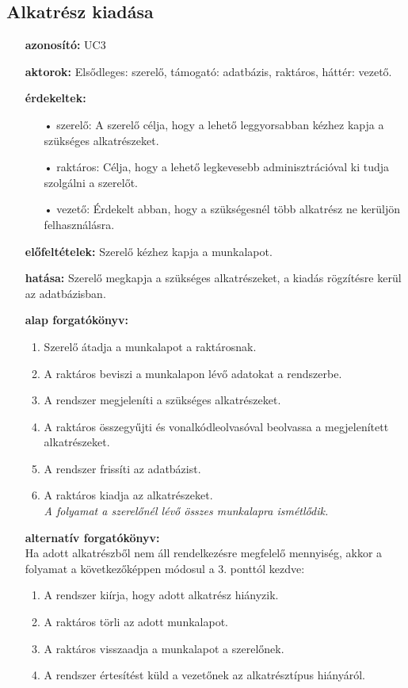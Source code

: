 \documentclass[12pt]{article}\usepackage[left=20mm,right=20mm,top=15mm,bottom=20mm]{geometry}
\begin{document}
\subsection{Alkatrész kiadása}
\begin{itemize}
\item[] \textbf{azonosító: } UC3
\item[] \textbf{aktorok: } Elsődleges: szerelő, támogató: adatbázis, raktáros, háttér: vezető.

\item[] \textbf{érdekeltek: }
\vspace*{-3mm}
\begin{itemize}
\item[•] szerelő: A szerelő célja, hogy a lehető leggyorsabban kézhez kapja a szükséges alkatrészeket.
\item[•] raktáros: Célja, hogy a lehető legkevesebb adminisztrációval ki tudja szolgálni a szerelőt.
\item[•] vezető: Érdekelt abban, hogy a szükségesnél több alkatrész ne kerüljön felhasználásra.
\end{itemize}

\item[] \textbf{előfeltételek: } Szerelő kézhez kapja a munkalapot.

\item[] \textbf{hatása: } Szerelő megkapja a szükséges alkatrészeket, a kiadás rögzítésre kerül az adatbázisban.

\item[] \textbf{alap forgatókönyv: }
\begin{enumerate}
\item Szerelő átadja a munkalapot a raktárosnak.
\item A raktáros beviszi a munkalapon lévő adatokat a rendszerbe.
\item A rendszer megjeleníti a szükséges alkatrészeket.
\item A raktáros összegyűjti és vonalkódleolvasóval beolvassa a megjelenített alkatrészeket.
\item A rendszer frissíti az adatbázist.
\item A raktáros kiadja az alkatrészeket. \\
\textit{A folyamat a szerelőnél lévő összes munkalapra ismétlődik.}
\end{enumerate}

\item[] \textbf{alternatív forgatókönyv:} \\
Ha adott alkatrészből nem áll rendelkezésre megfelelő mennyiség, akkor a folyamat a következőképpen módosul a 3. ponttól kezdve:
\begin{enumerate}
\item A rendszer kiírja, hogy adott alkatrész hiányzik.
\item A raktáros törli az adott munkalapot.
\item A raktáros visszaadja a munkalapot a szerelőnek.
\item A rendszer értesítést küld a vezetőnek az alkatrésztípus hiányáról.
\end{enumerate}


\end{itemize}
\end{document}
